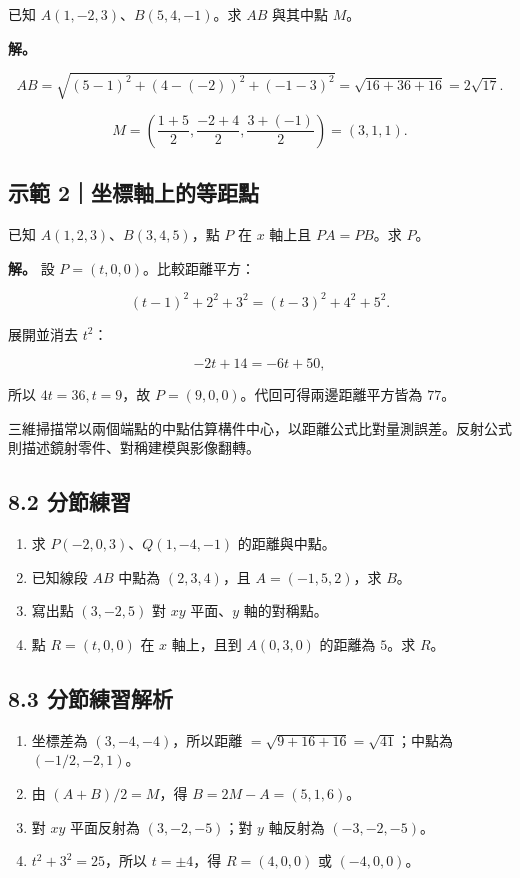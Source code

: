 \documentclass[11pt,a4paper]{article}
\providecommand{\tightlist}{%
  \setlength{\itemsep}{0pt}\setlength{\parskip}{0pt}}
\begin{document}
已知 \(A(1,-2,3)\)、\(B(5,4,-1)\)。求 \(AB\) 與其中點 \(M\)。

\textbf{解。}

\[
AB=\sqrt{(5-1)^2+(4-(-2))^2+(-1-3)^2}
=\sqrt{16+36+16}=2\sqrt{17}.
\]

\[
M=\left(\frac{1+5}{2},\frac{-2+4}{2},\frac{3+(-1)}{2}\right)
=(3,1,1).
\]

\subsection{示範 2｜坐標軸上的等距點}\label{ux793aux7bc4-2ux5750ux6a19ux8ef8ux4e0aux7684ux7b49ux8dddux9ede}

已知 \(A(1,2,3)\)、\(B(3,4,5)\)，點 \(P\) 在 \(x\) 軸上且 \(PA=PB\)。求 \(P\)。

\textbf{解。} 設 \(P=(t,0,0)\)。比較距離平方：

\[
(t-1)^2+2^2+3^2=(t-3)^2+4^2+5^2.
\]

展開並消去 \(t^2\)：

\[
-2t+14=-6t+50,
\]

所以 \(4t=36,t=9\)，故 \(P=(9,0,0)\)。代回可得兩邊距離平方皆為 \(77\)。

三維掃描常以兩個端點的中點估算構件中心，以距離公式比對量測誤差。反射公式則描述鏡射零件、對稱建模與影像翻轉。

\subsection{8.2 分節練習}\label{ux5206ux7bc0ux7df4ux7fd2-7}

\begin{enumerate}
\def\labelenumi{\arabic{enumi}.}
\tightlist
\item
  求 \(P(-2,0,3)\)、\(Q(1,-4,-1)\) 的距離與中點。
\item
  已知線段 \(AB\) 中點為 \((2,3,4)\)，且 \(A=(-1,5,2)\)，求 \(B\)。
\item
  寫出點 \((3,-2,5)\) 對 \(xy\) 平面、\(y\) 軸的對稱點。
\item
  點 \(R=(t,0,0)\) 在 \(x\) 軸上，且到 \(A(0,3,0)\) 的距離為 \(5\)。求 \(R\)。
\end{enumerate}

\subsection{8.3 分節練習解析}\label{ux5206ux7bc0ux7df4ux7fd2ux89e3ux6790-7}

\begin{enumerate}
\def\labelenumi{\arabic{enumi}.}
\tightlist
\item
  坐標差為 \((3,-4,-4)\)，所以距離 \(=\sqrt{9+16+16}=\sqrt{41}\)；中點為 \((-1/2,-2,1)\)。
\item
  由 \((A+B)/2=M\)，得 \(B=2M-A=(5,1,6)\)。
\item
  對 \(xy\) 平面反射為 \((3,-2,-5)\)；對 \(y\) 軸反射為 \((-3,-2,-5)\)。
\item
  \(t^2+3^2=25\)，所以 \(t=\pm4\)，得 \(R=(4,0,0)\) 或 \((-4,0,0)\)。
\end{enumerate}
\end{document}
